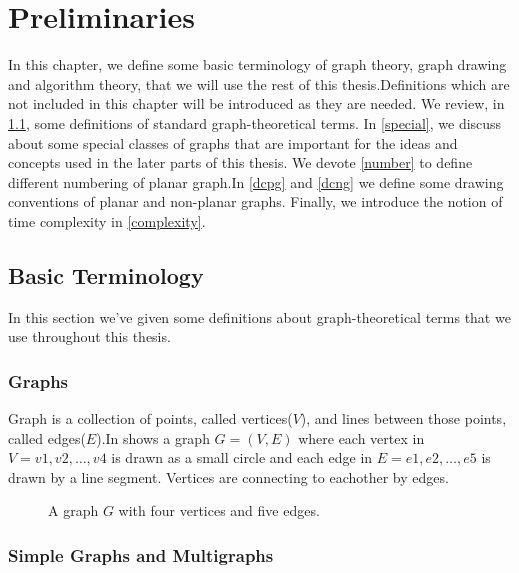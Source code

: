 \chapter{Preliminaries}
\label{preliminaries}


In this chapter, we define some basic terminology of graph theory, graph
drawing and algorithm theory, that we will use the rest of this
thesis.Definitions which are not included in this chapter will be introduced
as they are needed. We review, in \ref{basic}, some definitions of standard
graph-theoretical terms. In \ref{special}, we discuss about some special classes
of graphs that are important for the ideas and concepts used in the later
parts of this thesis. We devote \ref{number} to define different numbering of planar graph.In \ref{dcpg} and \ref{dcng} we define some
drawing conventions of planar and non-planar graphs. Finally, we introduce
the notion of time complexity in \ref{complexity}.




\section{Basic Terminology}
\label{basic}

In this section we've given some definitions about graph-theoretical terms that we
use throughout this thesis.

\subsection{Graphs}

Graph is a collection of points, called vertices($V$), and lines between those points, called edges($E$).In  shows a graph $G = (V, E)$ where each vertex in $ V = {v1, v2, \ldots , v4}$
is drawn as a small circle and each edge in $E = {e1, e2, \ldots , e5}$ is drawn by
a line segment. Vertices are connecting to eachother by edges.

\begin{figure}[!tb]
  \centering
\resizebox{40mm}{!}{}
\caption{A graph $G$ with four vertices and five edges.}
\label{fig:graph}
\end{figure}








\subsection{Simple Graphs and Multigraphs}


